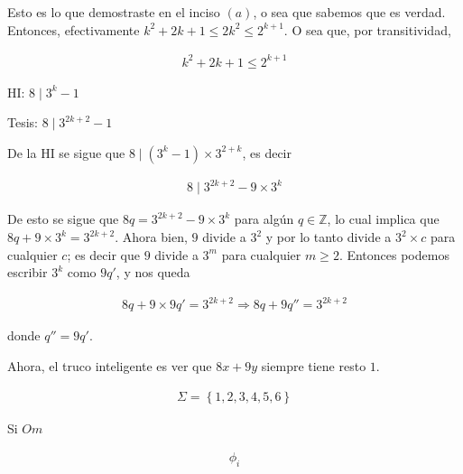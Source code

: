 \documentclass[a4paper, 12pt]{article}
\begin{document}
Esto es lo que demostraste en el inciso $(a)$, o sea que sabemos que es verdad. Entonces, 
efectivamente $k^2  + 2k + 1 \leq 2k^2 \leq 2^{k+1}$. O sea que, por transitividad,

\begin{align*}
    k^2 + 2k + 1 \leq 2^{k+1}
\end{align*}

\pagebreak 

HI: $8 \mid 3^k - 1$

Tesis: $8 \mid 3^{2k + 2} - 1$


De la HI se sigue que $8 \mid (3^k - 1) \times 3^{2+k}$, es decir 

\begin{align*}
    8 \mid 3^{2k+2} - 9 \times 3^k
\end{align*}

De esto se sigue que $8q = 3^{2k+2} - 9\times 3^k$ para algún $q \in
\mathbb{Z}$, lo cual implica que $8q + 9\times 3^k = 3^{2k+2}$. Ahora bien, $9$
divide a $3^2$ y por lo tanto divide a $3^2 \times c$ para cualquier $c$; es
decir que $9$ divide a $3^m$ para cualquier $m \geq 2$. Entonces podemos
escribir $3^k$ como $9q'$, y nos queda

\begin{align*}
    8q + 9 \times 9q' = 3^{2k+2} \Rightarrow 8q + 9q'' = 3^{2k+2}
\end{align*}

donde $q'' = 9q'$.

Ahora, el truco inteligente es ver que $8x + 9y$ siempre tiene resto $1$.















\begin{align*}
    \Sigma = \left\{ 1, 2, 3, 4, 5, 6 \right\} 
\end{align*}

Si $Om$

\begin{align*}
    \phi_i
\end{align*}
\end{document}

